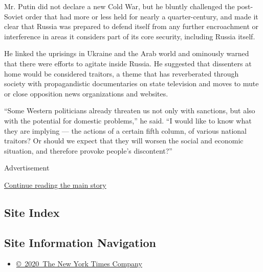 Mr. Putin did not declare a new Cold War, but he bluntly challenged the
post-Soviet order that had more or less held for nearly a
quarter-century, and made it clear that Russia was prepared to defend
itself from any further encroachment or interference in areas it
considers part of its core security, including Russia itself.

He linked the uprisings in Ukraine and the Arab world and ominously
warned that there were efforts to agitate inside Russia. He suggested
that dissenters at home would be considered traitors, a theme that has
reverberated through society with propagandistic documentaries on state
television and moves to mute or close opposition news organizations and
websites.

``Some Western politicians already threaten us not only with sanctions,
but also with the potential for domestic problems,'' he said. ``I would
like to know what they are implying --- the actions of a certain fifth
column, of various national traitors? Or should we expect that they will
worsen the social and economic situation, and therefore provoke people's
discontent?''

Advertisement

\protect\hyperlink{after-bottom}{Continue reading the main story}

\hypertarget{site-index}{%
\subsection{Site Index}\label{site-index}}

\hypertarget{site-information-navigation}{%
\subsection{Site Information
Navigation}\label{site-information-navigation}}

\begin{itemize}
\tightlist
\item
  \href{https://help.nytimes3xbfgragh.onion/hc/en-us/articles/115014792127-Copyright-notice}{©~2020~The
  New York Times Company}
\end{itemize}


